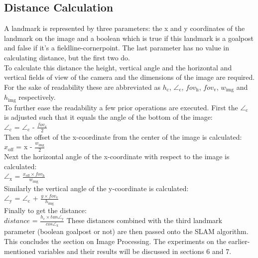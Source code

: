 \documentclass{ba-kecs}
\numberwithin{figure}{section}
\numberwithin{equation}{section}
\begin{document}
\subsection{Distance Calculation}
A landmark is represented by three parameters: the x and y coordinates of the landmark on the image and a boolean which is true if this landmark is a goalpost and false if it's a fieldline-cornerpoint. The last parameter has no value in calculating distance, but the first two do.\\
To calculate this distance the height, vertical angle and the horizontal and vertical fields of view of the camera and the dimensions of the image are required. For the sake of readability these are abbreviated as $h_{\mathrm{c}}$, $\angle_{\mathrm{c}}$, $fov_{\mathrm{h}}$, $fov_{\mathrm{v}}$, $w_{\mathrm{img}}$ and $h_{\mathrm{img}}$ respectively. \\
To further ease the readability a few prior operations are executed.
First the $\angle_{\mathrm{c}}$ is adjusted such that it equals the angle of the bottom of the image:\\
$\angle_{\mathrm{c}}$ = $\angle_{\mathrm{c}}$ - $\frac{fov_{\mathrm{v}}}{2}$ \\
Then the offset of the x-coordinate from the center of the image is calculated: \\
$x_{\mathrm{off}}$ = x - $\frac{w_{\mathrm{img}}}{2}$ \\
Next the horizontal angle of the x-coordinate with respect to the image is calculated: \\
$\angle_{\mathrm{x}}$ = $\frac{x_{\mathrm{off}} \times fov_{\mathrm{h}}}{w_{\mathrm{img}}}$ \\
Similarly the vertical angle of the y-coordinate is calculated: \\
$\angle_{\mathrm{y}}$ = $\angle_{\mathrm{c}}$ + $\frac{y \times fov_{\mathrm{v}}}{h_{\mathrm{img}}}$ \\
Finally to get the distance: \\
$\textit{distance}$ = $\frac{h_{\mathrm{c}} \times \textit{tan} \angle_{\mathrm{y}}}{\textit{cos} \angle_{\mathrm{x}}}$
These distances combined with the third landmark parameter (boolean goalpost or not) are then passed onto the SLAM algorithm. \\
This concludes the section on Image Processing. The experiments on the earlier-mentioned variables and their results will be discussed in sections 6 and 7. 

\end{document}
